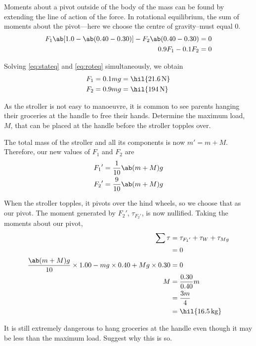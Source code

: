 Moments about a pivot outside of the body of the mass can be found by
extending the line of action
of the force. In {rotational equilibrium}, the sum of moments about
the pivot---here we choose
the centre of gravity--must equal \(0\).
\begin{align}
  F_1\ab[1.0-\ab(0.40-0.30)] - F_2\ab(0.40-0.30)&=0 \\
  0.9F_1 - 0.1F_2&=0
  \label{eq:roteq}
\end{align}

Solving \cref{eq:stateq} and \cref{eq:roteq} simultaneously, we obtain
\begin{align*}
  F_1 &= 0.1mg = \hil{\qty{21.6}{\newton}} \\
  F_2 &= 0.9mg = \hil{\qty{194}{\newton}}
\end{align*}

\begin{problem}
  As the stroller is not easy to manoeuvre, it is common to see parents
  hanging their groceries at the handle to free their hands.
  Determine the maximum load, \(M\), that can be placed at the handle
  before the stroller topples over.
\end{problem}

The total mass of the stroller and all its components is now \(m' = m + M\).
Therefore, our new values of \(F_1\) and \(F_2\) are
\begin{align*}
  {F_1}' &= \f{1}{10}\ab(m+M)g\\
  {F_2}' &= \f{9}{10}\ab(m+M)g
\end{align*}

When the stroller topples, it pivots over the hind wheels, so we
choose that as our pivot.
The moment generated by \({F_2}'\), \(\tau_{{F_2}'}\), is now nullified.
Taking the moments about our pivot,
\begin{align*}
  \sum\tau &= \tau_{{F_1}'} + \tau_{W} + \tau_{Mg} \\
  &= 0\\
  \f{\ab(m+M)g}{10}\times 1.00 - mg \times 0.40 + Mg
  \times 0.30
  &= 0 \\
  M&=\f{0.30}{0.40}m\\
  &=\f{3m}{4} \\
  &= \hil{\qty{16.5}{\kg}}
\end{align*}

\begin{problem}
  It is still extremely dangerous to hang groceries at the handle
  even though it may be less than the
  maximum load. Suggest why this is so.
\end{problem}

